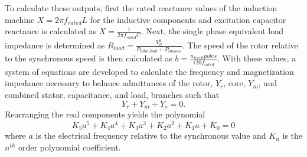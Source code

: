 To calculate these outputs, first the rated reactance values of the induction machine $X = 2 \pi f_{rated} L$ for the inductive components and excitation capacitor reactance is calculated as $X = \frac{1}{2 \pi f_{rated} C}$. Next, the single phase equivalent load impedance is determined as $R_{load} = \frac{V_{ll}^2}{P_{total\ load} + P_{inv loss}}$. 
The speed of the rotor relative to the synchronous speed is then calculated as $ b = \frac{n_{mech}poles}{120f_{rated}} $. With these values, a system of equations are developed to calculate the frequency and magnetization impedance necessary to balance admittances of the rotor, $Y_r$, core, $Y_m$, and combined stator, capacitance, and load, branches such that 
\begin{equation}
\label{eq:admit}
Y_r + Y_m + Y_s = 0.
\end{equation}
Rearranging the real components yields the polynomial 
\begin{equation*}
K_5a^5 + K_4a^4 + K_3a^3 + K_2a^2 + K_1a + K_0 = 0
\end{equation*}
where $a$ is the electrical frequency relative to the synchronous value and $K_n$ is the $n^{th}$ order polynomial coefficient. %

